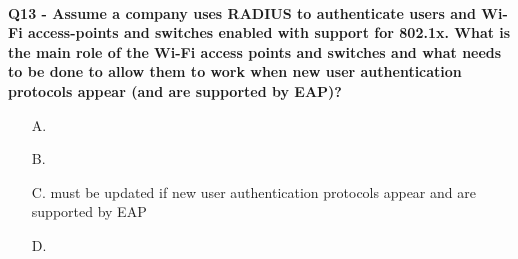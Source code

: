 \textbf{\\Q13 - Assume a company uses RADIUS to authenticate users and Wi-Fi access-points and switches enabled with support
for 802.1x. What is the main role of the Wi-Fi access points and switches and what needs to be done to allow them to
work when new user authentication protocols appear (and are supported by EAP)?}
\begin{itemize}
    \item[A.] 
    \item[B.] 
    \item[C.] must be updated if new user authentication protocols appear and are supported by EAP
    \item[D.] 
\end{itemize}


